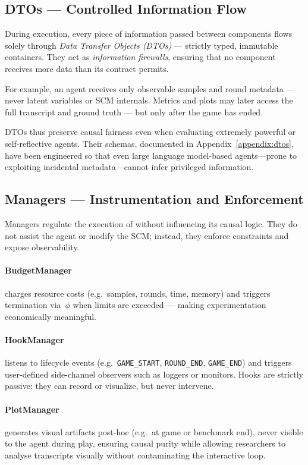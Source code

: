 \subsection{DTOs — Controlled Information Flow}

During execution, every piece of information passed between components flows solely through \emph{Data Transfer Objects (DTOs)} — strictly typed, immutable containers.  
They act as \emph{information firewalls}, ensuring that no component receives more data than its contract permits.

For example, an agent receives only observable samples and round metadata — never latent variables or SCM internals.  
Metrics and plots may later access the full transcript and ground truth — but only after the game has ended.

DTOs thus preserve causal fairness even when evaluating extremely powerful or self-reflective agents.
Their schemas, documented in Appendix~\ref{appendix:dtos}, have been engineered so that even large language model-based agents—prone to exploiting incidental metadata—cannot infer privileged information.

\subsection{Managers — Instrumentation and Enforcement}
Managers regulate the execution of \game without influencing its causal logic. They do not assist the agent or modify the SCM; instead, they enforce constraints and expose observability.

\paragraph{BudgetManager} charges resource costs (e.g.\ samples, rounds, time, memory) and triggers termination via~$\phi$ when limits are exceeded — making experimentation economically meaningful.

\paragraph{HookManager} listens to lifecycle events (e.g.\ \texttt{GAME\_START}, \texttt{ROUND\_END}, \texttt{GAME\_END}) and triggers user-defined side-channel observers such as loggers or monitors. Hooks are strictly passive: they can record or visualize, but never intervene.

\paragraph{PlotManager} generates visual artifacts post-hoc (e.g.\ at game or benchmark end), never visible to the agent during play, ensuring causal purity while allowing researchers to analyse transcripts visually without contaminating the interactive loop.

